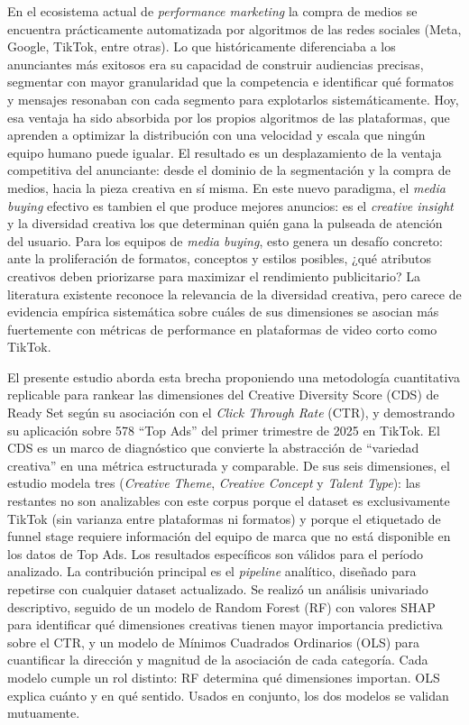 \documentclass[12pt, a4paper]{report}
\begin{document}
En el ecosistema actual de \textit{performance marketing} la compra de medios
se encuentra prácticamente automatizada por algoritmos de las redes sociales
(Meta, Google, TikTok, entre otras). Lo que históricamente diferenciaba a los anunciantes más exitosos
era su capacidad de construir audiencias precisas, segmentar con mayor
granularidad que la competencia e identificar qué formatos y mensajes
resonaban con cada segmento para explotarlos sistemáticamente. Hoy, esa
ventaja ha sido absorbida por los propios algoritmos de las plataformas, que
aprenden a optimizar la distribución con una velocidad y escala que ningún
equipo humano puede igualar. El resultado es un desplazamiento de la ventaja
competitiva del anunciante: desde el dominio de la segmentación y la compra
de medios, hacia la pieza creativa en sí misma. En este nuevo paradigma,
el \textit{media buying} efectivo es tambien el que produce mejores anuncios: es el
\textit{creative insight} y la diversidad creativa los que determinan
quién gana la pulseada de atención del usuario. Para los equipos de
\textit{media buying}, esto genera un desafío concreto: ante la proliferación
de formatos, conceptos y estilos posibles, ¿qué atributos creativos deben priorizarse para maximizar el
rendimiento publicitario? La literatura existente reconoce la relevancia de
la diversidad creativa, pero carece de evidencia empírica sistemática sobre
cuáles de sus dimensiones se asocian más fuertemente con métricas de
performance en plataformas de video corto como TikTok.

El presente estudio aborda esta brecha proponiendo una metodología cuantitativa
replicable para rankear las dimensiones del Creative Diversity Score (CDS) de
Ready Set según su asociación con el \textit{Click Through Rate} (CTR), y
demostrando su aplicación sobre 578 ``Top Ads'' del primer trimestre de 2025 en
TikTok. El CDS es un marco de diagnóstico que convierte la abstracción de
``variedad creativa'' en una métrica estructurada y comparable. De sus seis
dimensiones, el estudio modela tres (\textit{Creative Theme}, \textit{Creative Concept}
y \textit{Talent Type}): las restantes no son analizables con este corpus porque el dataset
es exclusivamente TikTok (sin varianza entre plataformas ni formatos) y porque
el etiquetado de funnel stage requiere información del equipo de marca que no está
disponible en los datos de Top Ads. Los resultados específicos son válidos para el período
analizado. La contribución principal es el \textit{pipeline} analítico, diseñado
para repetirse con cualquier dataset actualizado.
Se realizó un análisis univariado descriptivo, seguido de un modelo de
Random Forest (RF) con valores SHAP para identificar qué dimensiones creativas
tienen mayor importancia predictiva sobre el CTR, y un modelo de Mínimos
Cuadrados Ordinarios (OLS) para cuantificar la dirección y magnitud de la
asociación de cada categoría. Cada modelo cumple un rol distinto: RF determina
qué dimensiones importan. OLS explica cuánto y en qué sentido.
Usados en conjunto, los dos modelos se validan mutuamente.
\end{document}
